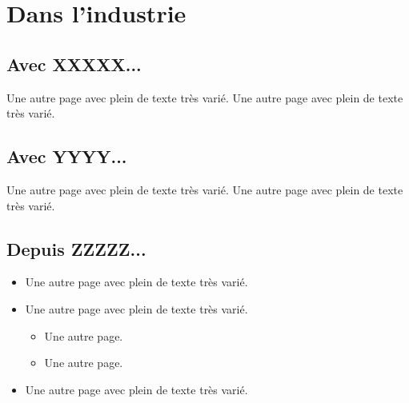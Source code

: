     \section{Dans l'industrie}

        \subsection{Avec XXXXX...}
            Une autre page avec plein de texte très varié.
            Une autre page avec plein de texte très varié.

        \subsection{Avec YYYY...}
            Une autre page avec plein de texte très varié.
            Une autre page avec plein de texte très varié.

        \subsection{Depuis ZZZZZ...}

            \begin{itemize}
                \item Une autre page avec plein de texte très varié.
                \item Une autre page avec plein de texte très varié.
                    \begin{itemize}
                        \item Une autre page.
                        \item Une autre page.
                    \end{itemize}
                \item Une autre page avec plein de texte très varié.
            \end{itemize}